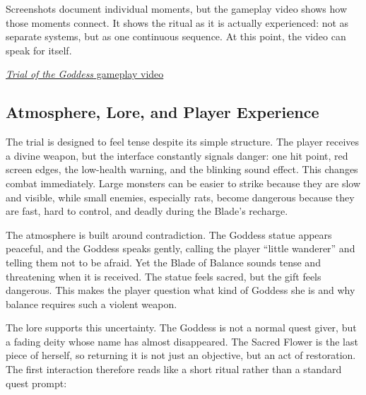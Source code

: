 Screenshots document individual moments,
but the gameplay video shows how those moments connect.
It shows the ritual as it is actually experienced:
not as separate systems,
but as one continuous sequence.
At this point,
the video can speak for itself.

\begin{center}
    \href{https://youtu.be/CctIfYMitXA?si=-ceZpl9l_rW2kv8R}
    {\textit{Trial of the Goddess} gameplay video}
\end{center}
\subsection{Atmosphere, Lore, and Player Experience}

The trial is designed to feel tense despite its simple structure.
The player receives a divine weapon,
but the interface constantly signals danger:
one hit point,
red screen edges,
the low-health warning,
and the blinking sound effect.
This changes combat immediately.
Large monsters can be easier to strike because they are slow and visible,
while small enemies,
especially rats,
become dangerous because they are fast,
hard to control,
and deadly during the Blade's recharge.

The atmosphere is built around contradiction.
The Goddess statue appears peaceful,
and the Goddess speaks gently,
calling the player
``little wanderer''
and telling them not to be afraid.
Yet the Blade of Balance sounds tense and threatening when it is received.
The statue feels sacred,
but the gift feels dangerous.
This makes the player question what kind of Goddess she is
and why balance requires such a violent weapon.

The lore supports this uncertainty.
The Goddess is not a normal quest giver,
but a fading deity whose name has almost disappeared.
The Sacred Flower is the last piece of herself,
so returning it is not just an objective,
but an act of restoration.
The first interaction therefore reads like a short ritual
rather than a standard quest prompt:

